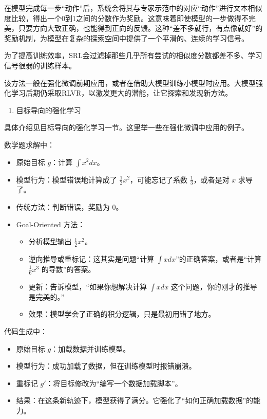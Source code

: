 在模型完成每一步``动作''后，系统会将其与专家示范中的对应``动作''进行文本相似度比较，得出一个0到1之间的分数作为奖励。这意味着即使模型的一步做得不完美，只要方向大致正确，也能得到正向的反馈。这种``差不多就行，有点像就好''的奖励机制，为模型在复杂的探索空间中提供了一个平滑的、连续的学习信号。

为了提高训练效率，SRL会过滤掉那些几乎所有尝试的相似度分数都差不多、学习信号很弱的训练样本。

该方法一般在强化微调前期应用，或者在借助大模型训练小模型时应用。大模型强化学习后期仍采取RLVR，以激发更大的潜能，让它探索和发现新方法。

\begin{enumerate}
\def\labelenumi{\arabic{enumi}.}
\setcounter{enumi}{2}
\tightlist
\item
  目标导向的强化学习
\end{enumerate}

具体介绍见目标导向的强化学习一节。这里举一些在强化微调中应用的例子。

数学题求解中：

\begin{itemize}
\tightlist
\item
  原始目标 \(g\)：计算 \(\int x^2 dx\)。
\item
  模型行为：模型错误地计算成了 \(\frac{1}{2}x^2\)，可能忘记了系数 \(\frac{1}{3}\)，或者是对 \(x\) 求导了。
\item
  传统方法：判断错误，奖励为 0。
\item
{}
  Goal-Oriented 方法：

  \begin{itemize}
  \tightlist
  \item
    分析模型输出 \(\frac{1}{2}x^2\)。
  \item
    逆向推导或重标记：这其实是问题``计算 \(\int x dx\)''的正确答案，或者是``计算 \(\frac{1}{6}x^3\) 的导数''的答案。
  \item
    更新：告诉模型，``如果你想解决计算 \(\int x dx\) 这个问题，你的刚才的推导是完美的。''
  \item
    效果：模型学会了正确的积分逻辑，只是最初用错了地方。
  \end{itemize}
\end{itemize}

代码生成中：

\begin{itemize}
\tightlist
\item
  原始目标 \(g\)：加载数据并训练模型。
\item
  模型行为：成功加载了数据，但在训练模型时报错崩溃。
\item
  重标记 \(g'\)：将目标修改为``编写一个数据加载脚本''。
\item
  结果：在这条新轨迹下，模型获得了满分。它强化了``如何正确加载数据''的能力。
\end{itemize}

